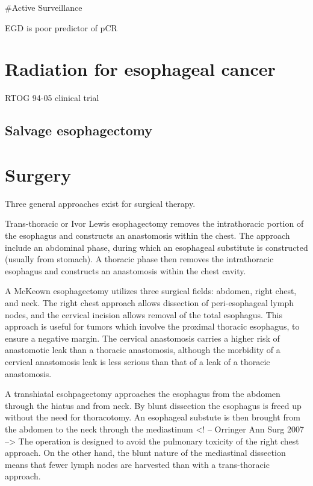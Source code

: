\documentclass[
]{book}
\begin{document}
\#Active Surveillance

EGD is poor predictor of pCR \citep{sarkaria764}

\hypertarget{radiation-for-esophageal-cancer}{%
\chapter{Radiation for esophageal cancer}\label{radiation-for-esophageal-cancer}}

RTOG 94-05 clinical trial \citep{minsky1167}

\hypertarget{salvage-esophagectomy}{%
\section{Salvage esophagectomy}\label{salvage-esophagectomy}}

\citep{markar922}

\citep{swisher175}

\hypertarget{surgery}{%
\chapter{Surgery}\label{surgery}}

Three general approaches exist for surgical therapy.

Trans-thoracic or Ivor Lewis esophagectomy\citep{visbal1803} removes the intrathoracic portion of the esophagus and constructs an anastomosis within the chest. The approach include an abdominal phase, during which an esophageal substitute is constructed (usually from stomach). A thoracic phase then removes the intrathoracic esophagus and constructs an anastomosis within the chest cavity.

A McKeown esophagectomy utilizes three surgical fields: abdomen, right chest, and neck. The right chest approach allows dissection of peri-esophageal lymph nodes, and the cervical incision allows removal of the total esophagus.\citep{mckeown259} This approach is useful for tumors which involve the proximal thoracic esophagus, to ensure a negative margin. The cervical anastomosis carries a higher risk of anastomotic leak than a thoracic anastomosis, although the morbidity of a cervical anastomosis leak is less serious than that of a leak of a thoracic anastomosis.

A transhiatal esohpagectomy approaches the esophagus from the abdomen through the hiatus and from neck. By blunt dissection the esophagus is freed up without the need for thoracotomy. An esophageal substute is then brought from the abdomen to the neck through the mediastinum\citep{orringer643} \citep{orringer363}\textless! -- Orringer Ann Surg 2007 --\textgreater{} The operation is designed to avoid the pulmonary toxicity of the right chest approach. On the other hand, the blunt nature of the mediastinal dissection means that fewer lymph nodes are harvested than with a trans-thoracic approach.
\end{document}
